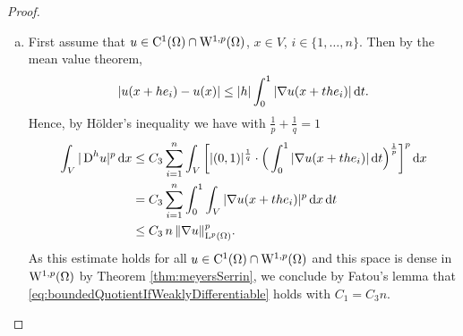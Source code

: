 \begin{proof}
  \begin{enumerate}[a)]
    \item First assume that $u \in \mathrm{C}^1(\Omega) \cap \mathrm{W}^{1,p}(\Omega)$, $x \in V$, $i \in \{1,\dots,n\}$.
      Then by the mean value theorem,
      $$
      |u(x + he_i) - u(x)| \leq |h| \int_0^1 |\nabla u(x + th e_i)| \, {\operatorname{d}\!{t}}.
      $$
      Hence, by Hölder's inequality we have with $\frac{1}{p} + \frac{1}{q} = 1$
      \begin{align*}
        \int_V |\,{\operatorname{D}}^h u|^p \, {\operatorname{d}\!{x}}
        &\leq C_3 \sum_{i = 1}^n \int_V \bigg[ |(0,1)|^{\frac{1}{q}} \cdot \Big( \int_0^1 |\nabla u(x + the_i)| \, {\operatorname{d}\!{t}} \Big)^{\frac{1}{p}} \bigg]^p \, {\operatorname{d}\!{x}} \\
        &= C_3 \sum_{i = 1}^n \int_0^1 \int_V |\nabla u(x + the_i)|^p \, {\operatorname{d}\!{x}} \, {\operatorname{d}\!{t}} \\
        &\leq C_3\, n\, \|\nabla u\|^p_{\mathrm{L}^p(\Omega)}.
      \end{align*}
      As this estimate holds for all $u \in \mathrm{C}^1(\Omega) \cap \mathrm{W}^{1,p}(\Omega)$ and this space is dense in $\mathrm{W}^{1,p}(\Omega)$ by Theorem \ref{thm:meyersSerrin}, we conclude by Fatou's lemma that \eqref{eq:boundedQuotientIfWeaklyDifferentiable} holds with $C_1 = C_3 n$.


\end{enumerate}
\end{proof}
